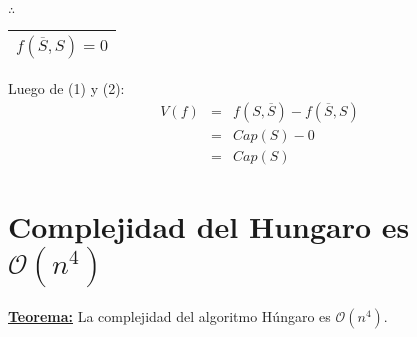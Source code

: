 \documentclass[12pt,a4paper]{report}
\begin{document}
\begin{enumerate}[(1)]
							\vspace{3mm}
							\par $\therefore$ \begin{tabular}{|c|} \hline $ f(\overline{S}, S) = 0 $ \\\hline \end{tabular}
					\end{enumerate}

					\par Luego de (1) y (2):
					\begin{eqnarray}
						\nonumber V(f) &=& f(S, \overline{S}) - f(\overline{S}, S)\\
						\nonumber &=& Cap(S) - 0 \\
						\nonumber &=& Cap(S)
					\end{eqnarray}


	\section{Complejidad del Hungaro es $\mathcal{O}(n^{4})$}
		\textbf{\underline{Teorema:}} La complejidad del algoritmo Húngaro es $\mathcal{O}(n^{4})$.
\end{document}
